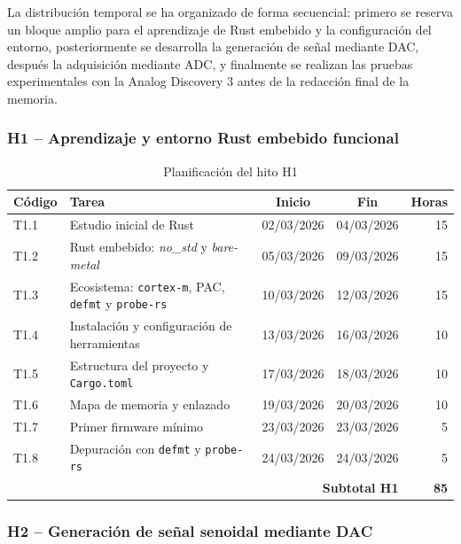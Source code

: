 \documentclass[11pt,a4paper]{article}
\begin{document}
La distribución temporal se ha organizado de forma secuencial: primero se reserva un bloque amplio para el aprendizaje de Rust embebido y la configuración del entorno, posteriormente se desarrolla la generación de señal mediante DAC, después la adquisición mediante ADC, y finalmente se realizan las pruebas experimentales con la Analog Discovery 3 antes de la redacción final de la memoria.

\subsubsection{H1 -- Aprendizaje y entorno Rust embebido funcional}

\begin{table}[H]
\centering
\small
\begin{tabularx}{\textwidth}{lXccr}
\toprule
\textbf{Código} & \textbf{Tarea} & \textbf{Inicio} & \textbf{Fin} & \textbf{Horas} \\
\midrule
T1.1 & Estudio inicial de Rust & 02/03/2026 & 04/03/2026 & 15 \\
T1.2 & Rust embebido: \textit{no\_std} y \textit{bare-metal} & 05/03/2026 & 09/03/2026 & 15 \\
T1.3 & Ecosistema: \texttt{cortex-m}, PAC, \texttt{defmt} y \texttt{probe-rs} & 10/03/2026 & 12/03/2026 & 15 \\
T1.4 & Instalación y configuración de herramientas & 13/03/2026 & 16/03/2026 & 10 \\
T1.5 & Estructura del proyecto y \texttt{Cargo.toml} & 17/03/2026 & 18/03/2026 & 10 \\
T1.6 & Mapa de memoria y enlazado & 19/03/2026 & 20/03/2026 & 10 \\
T1.7 & Primer firmware mínimo & 23/03/2026 & 23/03/2026 & 5 \\
T1.8 & Depuración con \texttt{defmt} y \texttt{probe-rs} & 24/03/2026 & 24/03/2026 & 5 \\
\midrule
\multicolumn{4}{r}{\textbf{Subtotal H1}} & \textbf{85} \\
\bottomrule
\end{tabularx}
\caption{Planificación del hito H1}
\label{tab:hito1}
\end{table}

\subsubsection{H2 -- Generación de señal senoidal mediante DAC}
\end{document}
